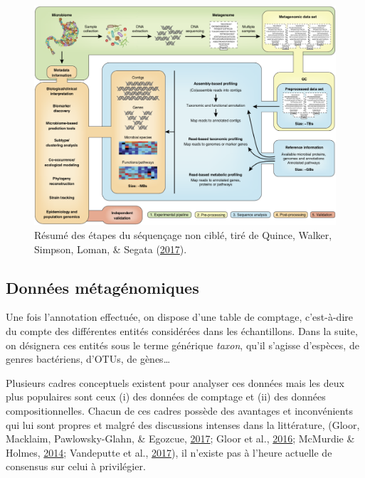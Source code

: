 \documentclass[12pt,a4paper]{reedthesis}
\theoremstyle{definition}
\theoremstyle{definition}
\theoremstyle{definition}
\theoremstyle{remark}
\begin{document}
\begin{figure}

{\centering \includegraphics[width=0.9\linewidth]{img/shotgun} 

}

\caption{Résumé des étapes du séquençage non ciblé, tiré de Quince, Walker, Simpson, Loman, \& Segata (\protect\hyperlink{ref-quince2017shotgun}{2017}).}\label{fig:shotgun}
\end{figure}
\hypertarget{donneesmetagenomiques}{%
\subsection{Données métagénomiques}\label{donneesmetagenomiques}}

Une fois l'annotation effectuée, on dispose d'une table de comptage, c'est-à-dire du compte des différentes entités considérées dans les échantillons. Dans la suite, on désignera ces entités sous le terme générique \emph{taxon}, qu'il s'agisse d'espèces, de genres bactériens, d'OTUs, de gènes\ldots{}

Plusieurs cadres conceptuels existent pour analyser ces données mais les deux plus populaires sont ceux (i) des données de comptage et (ii) des données compositionnelles. Chacun de ces cadres possède des avantages et inconvénients qui lui sont propres et malgré des discussions intenses dans la littérature, (Gloor, Macklaim, Pawlowsky-Glahn, \& Egozcue, \protect\hyperlink{ref-gloor2017microbiome}{2017}; Gloor et al., \protect\hyperlink{ref-gloor2016relative}{2016}; McMurdie \& Holmes, \protect\hyperlink{ref-mcmurdie2014waste}{2014}; Vandeputte et al., \protect\hyperlink{ref-vandeputte2017quantitative}{2017}), il n'existe pas à l'heure actuelle de consensus sur celui à privilégier.
\end{document}

